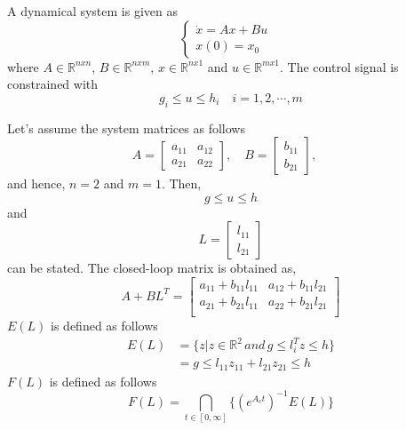 A dynamical system is given as
\begin{equation}
    \begin{cases}
    \dot{x}=Ax+Bu&\\
    x(0)=x_0&
    \end{cases}
\end{equation}
where $A\in\mathbb{R}^{nxn}$, $B\in\mathbb{R}^{nxm}$, $x\in\mathbb{R}^{nx1}$ and $u\in\mathbb{R}^{mx1}$. The control signal is constrained with 
\begin{equation}
    g_i\leq u\leq h_i\quad i=1,2,\cdots,m
\end{equation}

Let's assume the system matrices as follows
\begin{equation}
    A=\begin{bmatrix}
        a_{11}& a_{12}\\
        a_{21}& a_{22}
    \end{bmatrix},\quad
    B=\begin{bmatrix}
        b_{11}\\b_{21}
    \end{bmatrix},\quad
\end{equation}
and hence, $n=2$ and $m=1$. Then,
\begin{equation}
    g\leq u\leq h
\end{equation}
and 
\begin{equation}
    L=\begin{bmatrix}
        l_{11}\\l_{21}
    \end{bmatrix}
\end{equation}
can be stated. The closed-loop matrix is obtained as,
\begin{equation}
    A+BL^T=\begin{bmatrix}
        a_{11} + b_{11}l_{11}& a_{12} + b_{11}l_{21}\\
        a_{21} + b_{21}l_{11}& a_{22} + b_{21}l_{21}\\
    \end{bmatrix}
\end{equation}
$E(L)$ is defined as follows
\begin{equation}
\begin{split}
    E(L)&=\{z|z\in\mathbb{R}^2\,and\,g\leq l_i^Tz\leq h\}\\
    &=g\leq l_{11}z_{11} + l_{21}z_{21}\leq h
\end{split}
\end{equation}
$F(L)$ is defined as follows
\begin{equation}
    F(L)=\bigcap\limits_{t\in[0,\infty]}\{(e^{A_ct})^{-1}E(L)\}
\end{equation}
